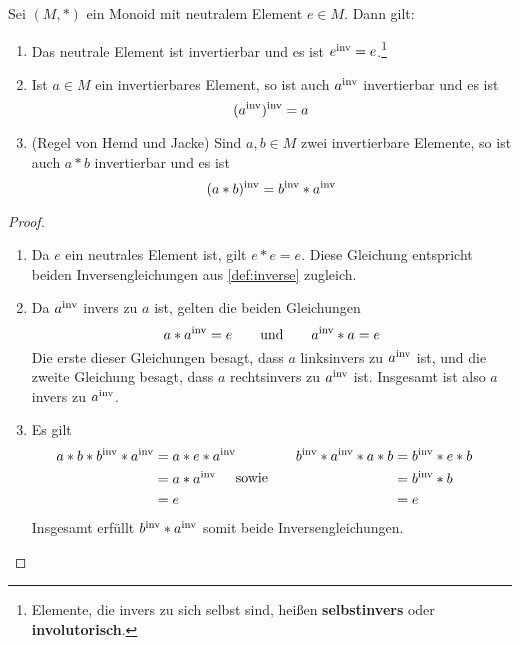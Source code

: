 \begin{satz} \label{regelnfuerinv} 
    Sei $(M,*)$ ein Monoid mit neutralem Element $e\in M$. Dann gilt:
    \begin{enumerate}
        \item Das neutrale Element ist invertierbar und es ist $e^{\mathrm{inv}} = e$.\footnote{Elemente, die invers zu sich selbst sind, heißen \textbf{selbstinvers} oder \textbf{involutorisch}.}
        \item Ist $a\in M$ ein invertierbares Element, so ist auch $a^{\mathrm{inv}}$ invertierbar und es ist
            \[(a^{\mathrm{inv}})^{\mathrm{inv}} = a \]
        \item(Regel von Hemd und Jacke) Sind $a,b\in M$ zwei invertierbare Elemente, so ist auch $a*b$ invertierbar und es ist
            \[ (a*b)^{\mathrm{inv}} = b^{\mathrm{inv}} * a^{\mathrm{inv}} \]
    \end{enumerate}
\end{satz}
\begin{proof}
    \begin{enumerate}
        \item Da $e$ ein neutrales Element ist, gilt $e*e=e$. Diese Gleichung entspricht beiden Inversengleichungen aus \cref{def:inverse} zugleich.
        \item Da $a^{\mathrm{inv}}$ invers zu $a$ ist, gelten die beiden Gleichungen
            \[ a*a^{\mathrm{inv}} = e \qquad\text{und}\qquad a^{\mathrm{inv}} * a=e \]
        Die erste dieser Gleichungen besagt, dass $a$ linksinvers zu $a^{\mathrm{inv}}$ ist, und die zweite Gleichung besagt, dass $a$ rechtsinvers zu $a^{\mathrm{inv}}$ ist. Insgesamt ist also $a$ invers zu $a^{\mathrm{inv}}$.
        \item Es gilt
        \begin{align*}
            \begin{split}
                a*b* b^{\mathrm{inv}} *a^{\mathrm{inv}}  & =  a*e*a^{\mathrm{inv}} \\
                & = a*a^{\mathrm{inv}} \\
                & = e
            \end{split} & \text{sowie}\qquad \begin{split}
                b^{\mathrm{inv}} *a^{\mathrm{inv}} * a*b  & =  b^{\mathrm{inv}} * e* b \\
                & = b^{\mathrm{inv}} * b \\
                & = e
            \end{split}
        \end{align*}
        Insgesamt erfüllt $b^{\mathrm{inv}} *a^{\mathrm{inv}}$ somit beide Inversengleichungen. \qedhere
    \end{enumerate}
\end{proof}



